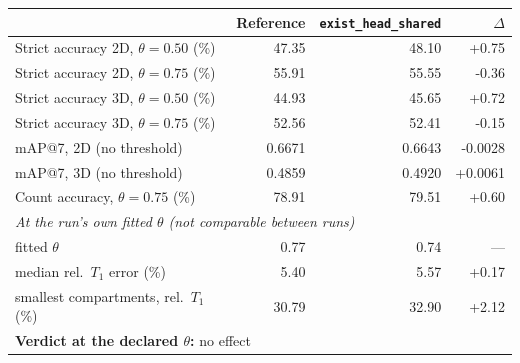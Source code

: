 \renewcommand{\arraystretch}{1.05}
\begin{tabular}{lrrr}
\toprule
 & Reference & \texttt{exist\_head\_shared} & $\Delta$ \\
\midrule
Strict accuracy 2D, $\theta = 0.50$ (\%) & 47.35 & 48.10 & +0.75 \\
Strict accuracy 2D, $\theta = 0.75$ (\%) & 55.91 & 55.55 & -0.36 \\
Strict accuracy 3D, $\theta = 0.50$ (\%) & 44.93 & 45.65 & +0.72 \\
Strict accuracy 3D, $\theta = 0.75$ (\%) & 52.56 & 52.41 & -0.15 \\
\midrule
mAP@7, 2D (no threshold) & 0.6671 & 0.6643 & -0.0028 \\
mAP@7, 3D (no threshold) & 0.4859 & 0.4920 & +0.0061 \\
\midrule
Count accuracy, $\theta = 0.75$ (\%) & 78.91 & 79.51 & +0.60 \\
\midrule
\multicolumn{4}{l}{\emph{At the run's own fitted $\theta$ (not comparable between runs)}} \\
\quad fitted $\theta$ & 0.77 & 0.74 & --- \\
\quad median rel.\ $T_1$ error (\%) & 5.40 & 5.57 & +0.17 \\
\quad smallest compartments, rel.\ $T_1$ (\%) & 30.79 & 32.90 & +2.12 \\
\midrule
\multicolumn{4}{l}{\textbf{Verdict at the declared $\theta$:} no effect} \\
\bottomrule
\end{tabular}
